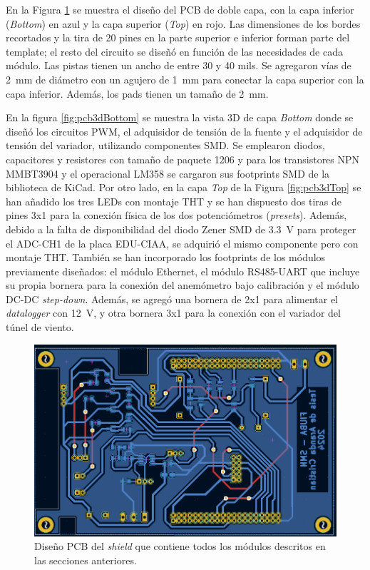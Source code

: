 
En la Figura \ref{fig:pcbDesing} se muestra el diseño del PCB de doble capa, con la capa inferior (\textit{Bottom}) en azul y la capa superior (\textit{Top}) en rojo. Las dimensiones de los bordes recortados y la tira de 20 pines en la parte superior e inferior forman parte del template; el resto del circuito se diseñó en función de las necesidades de cada módulo. Las pistas tienen un ancho de entre 30 y 40 mils. Se agregaron vías de \SI{2}{\milli\meter} de diámetro con un agujero de \SI{1}{\milli\meter} para conectar la capa superior con la capa inferior. Además, los pads tienen un tamaño de \SI{2}{\milli\meter}.




En la figura \ref{fig:pcb3dBottom} se muestra la vista 3D de capa \textit{Bottom} donde se diseñó los circuitos PWM, el adquisidor de tensión de la fuente y el adquisidor de tensión del variador, utilizando componentes SMD. Se emplearon diodos, capacitores y resistores con tamaño de paquete 1206 y para los transistores NPN MMBT3904 y el operacional LM358 se cargaron sus footprints SMD de la biblioteca de KiCad. Por otro lado, en la capa \textit{Top} de la Figura \ref{fig:pcb3dTop} se han añadido los tres LEDs con montaje THT y se han dispuesto dos tiras de pines 3x1 para la conexión física de los dos potenciómetros (\textit{presets}). Además, debido a la falta de disponibilidad del diodo Zener SMD de \SI{3.3}{\volt} para proteger el ADC-CH1 de la placa EDU-CIAA, se adquirió el mismo componente pero con montaje THT. También se han incorporado los footprints de los módulos previamente diseñados: el módulo Ethernet, el módulo RS485-UART que incluye su propia bornera para la conexión del anemómetro bajo calibración y el módulo DC-DC \textit{step-down}. Además, se agregó una bornera de 2x1 para alimentar el \textit{datalogger} con \SI{12}{\volt}, y otra bornera 3x1 para la conexión con el variador del túnel de viento.
\begin{figure}[H]
    \centering
    \includegraphics[width=1\linewidth]{Figuras/datalogger/Hardware/pcbDesing.png}
    \caption{Diseño PCB del \textit{shield} que contiene todos los módulos descritos en las secciones anteriores.}
    \label{fig:pcbDesing}
\end{figure}

